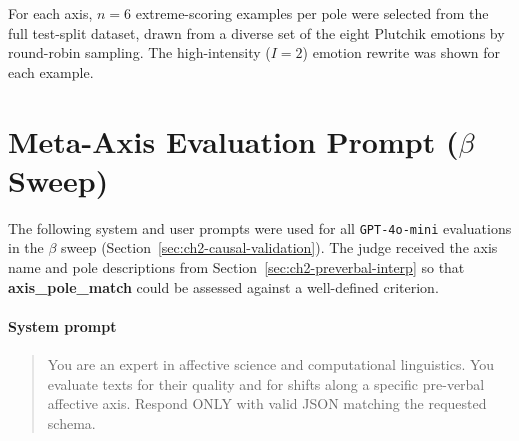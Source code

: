 For each axis, $n=6$ extreme-scoring examples per pole were selected from the full
test-split dataset, drawn from a diverse set of the eight Plutchik emotions by
round-robin sampling.  The high-intensity ($I=2$) emotion rewrite was shown for each
example.

\section{Meta-Axis Evaluation Prompt (\texorpdfstring{$\beta$}{beta} Sweep)}
\label{app:eval_prompt_beta}

The following system and user prompts were used for all \texttt{GPT-4o-mini} evaluations in the
$\beta$ sweep (Section~\ref{sec:ch2-causal-validation}).
The judge received the axis name and pole descriptions from Section~\ref{sec:ch2-preverbal-interp} so that
\textbf{axis\_pole\_match} could be assessed against a well-defined criterion.

\paragraph{System prompt}
\begin{quote}
\small\ttfamily
You are an expert in affective science and computational linguistics.
You evaluate texts for their quality and for shifts along a specific pre-verbal affective
axis. Respond ONLY with valid JSON matching the requested schema.
\end{quote}

